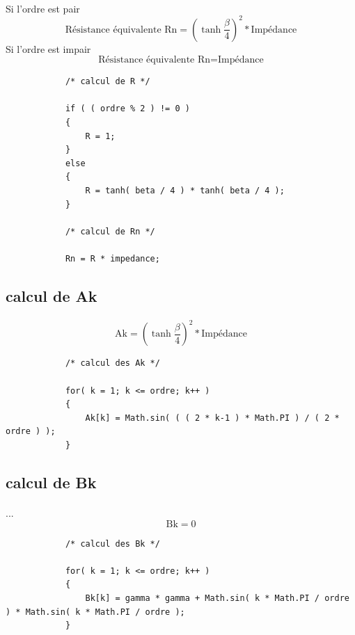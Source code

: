 \documentclass[a4paper,11pt]{article}
\begin{document}
        \paragraph{}
        Si l'ordre est pair \[ \mbox{Résistance équivalente Rn} = ( \tanh{ \frac{ \beta }{ 4 } } ) ^2 * \mbox{Impédance} \]
        Si l'ordre est impair \[ \mbox{Résistance équivalente Rn} = \mbox{Impédance} \]
        \begin{lstlisting}
            /* calcul de R */

            if ( ( ordre % 2 ) != 0 )
            {
                R = 1;
            }
            else
            {
                R = tanh( beta / 4 ) * tanh( beta / 4 );
            }

            /* calcul de Rn */

            Rn = R * impedance;

        \end{lstlisting}

    \subsection{calcul de Ak }
        \paragraph{}
        \[ \mbox{Ak} = ( \tanh{ \frac{ \beta }{ 4 } } ) ^2 * \mbox{Impédance} \]
        \begin{lstlisting}
            /* calcul des Ak */

            for( k = 1; k <= ordre; k++ )
            {
                Ak[k] = Math.sin( ( ( 2 * k-1 ) * Math.PI ) / ( 2 * ordre ) );
            }

        \end{lstlisting}

    \clearpage

    \subsection{calcul de Bk }
        \paragraph{}
        ... \[ \mbox{Bk} = 0 \]
        \begin{lstlisting}
            /* calcul des Bk */

            for( k = 1; k <= ordre; k++ )
            {
                Bk[k] = gamma * gamma + Math.sin( k * Math.PI / ordre ) * Math.sin( k * Math.PI / ordre );
            }

        \end{lstlisting}
\end{document}
